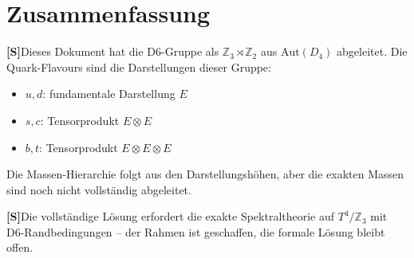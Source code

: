 \documentclass[11pt,a4paper]{article}
\newcommand{\Sstatus}{\textbf{[S]}}
\begin{document}
	\section{Zusammenfassung}
	
	\Sstatus Dieses Dokument hat die D6-Gruppe als $\mathbb{Z}_3 \rtimes \mathbb{Z}_2$ aus $\text{Aut}(D_4)$ abgeleitet. Die Quark-Flavours sind die Darstellungen dieser Gruppe:
	
	\begin{itemize}
		\item $u, d$: fundamentale Darstellung $E$
		\item $s, c$: Tensorprodukt $E \otimes E$
		\item $b, t$: Tensorprodukt $E \otimes E \otimes E$
	\end{itemize}
	
	Die Massen-Hierarchie folgt aus den Darstellungshöhen, aber die exakten Massen sind noch nicht vollständig abgeleitet.
	
	\Sstatus Die vollständige Lösung erfordert die exakte Spektraltheorie auf $T^4/\mathbb{Z}_3$ mit D6-Randbedingungen -- der Rahmen ist geschaffen, die formale Lösung bleibt offen.
	
	\vspace{1cm}
	\begin{center}
	\end{center}
	
\end{document}
